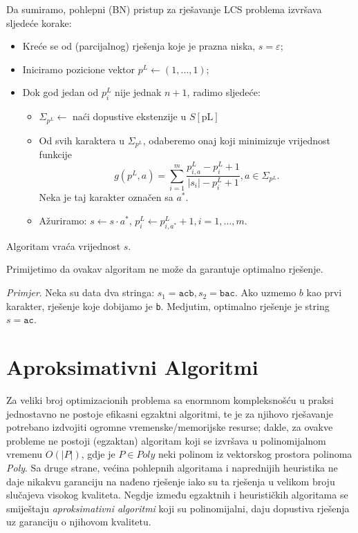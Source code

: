 \documentclass[a4paper, utf8, 11pt, colorlinks]{book}
\begin{document}
\noindent Da sumiramo, pohlepni (BN) pristup za rješavanje LCS problema izvršava sljedeće korake:
\begin{itemize}
	\item Kreće se od (parcijalnog) rješenja koje je prazna niska, $s=\varepsilon$;
	\item Iniciramo pozicione vektor $p^L \gets (1,\ldots, 1) $;
	\item Dok god jedan od $p^L_i$ nije jednak $n+1$, radimo sljedeće: 
	\begin{itemize}
   	     \item $\Sigma_{p^L} \gets$ naći dopustive ekstenzije u $S[\textrm{pL}]$
	      \item Od svih karaktera u $\Sigma_{p^L}$, odaberemo onaj koji minimizuje vrijednost funkcije 
	      $$g( p^L,a) = \sum_{i=1}^m\frac{p^L_{i,a} - p^L_i + 1 }{|s_i| - p^L_i + 1 }, a \in \Sigma_{ p^L }.$$
	      Neka je taj karakter označen sa $a^*$. 
	      \item Ažuriramo: $s \gets  s \cdot a^*$, $p^L_i \gets p^L_{i, a^*} +1, i = 1,\ldots,m.$
    \end{itemize}
\end{itemize}
Algoritam vraća vrijednost $s$. 

Primijetimo da ovakav algoritam ne može da garantuje optimalno rješenje. 

\noindent \emph{Primjer}.  Neka su data dva stringa: $s_1 = \texttt{acb}, s_2 = \texttt{bac}$. Ako uzmemo  $ b$ kao prvi karakter, rješenje koje dobijamo je \texttt{b}. Medjutim, optimalno rješenje je string $s=\texttt{ac}$. 

\section{Aproksimativni Algoritmi}
  
   Za veliki broj optimizacionih problema sa enormnom kompleksnošću u praksi jednostavno ne postoje efikasni egzaktni algoritmi, te je za  njihovo rješavanje potrebano izdvojiti ogromne vremenske/memorijske resurse; dakle, za  ovakve probleme ne postoji (egzaktan) algoritam koji se izvršava u polinomijalnom vremenu $O(|P|)$, gdje je $P \in {Poly}$ neki polinom iz vektorskog prostora polinoma \emph{Poly}. Sa druge strane, većina pohlepnih algoritama i naprednijih heuristika ne daje nikakvu garanciju na nađeno rješenje iako su ta rješenja u velikom broju slučajeva visokog kvaliteta. Negdje između egzaktnih i heurističkih algoritama se smiještaju \emph{aproksimativni algoritmi} koji su polinomijalni, daju dopustiva rješenja uz garanciju o njihovom kvalitetu. 
  
\end{document}
